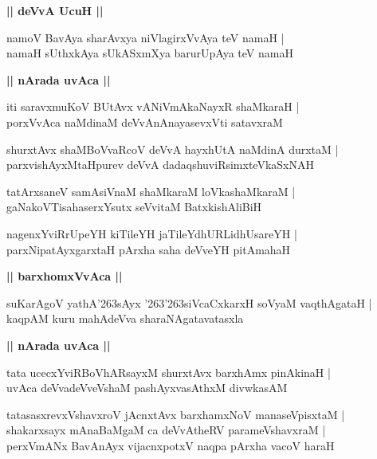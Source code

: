 \documentclass[twoside,12pt,openright]{book}
\def\S{\char'263}
\newcounter{shloka}[chapter]
\def\uvaca#1{\centerline{{\large\textbf{#1}}}}
\begin{document}
\uvaca{|| deVvA UcuH ||}

\begin{shloka}%
namoV BavAya sharAvxya  niVlagirxVvAya teV namaH |\\
namaH sUthxkAya sUkASxmXya barurUpAya teV namaH 
\end{shloka}

\uvaca{|| nArada uvAca ||}

\begin{shloka}%
iti saravxmuKoV BUtAvx vANiVmAkaNayxR shaMkaraH |\\
porxVvAca naMdinaM deVvAnAnayasevxVti satavxraM 
\end{shloka}

\begin{shloka}%
shurxtAvx shaMBoVvaRcoV deVvA hayxhUtA naMdinA durxtaM |\\
parxvishAyxMtaHpurev deVvA dadaqshuviRsimxteVkaSxNAH
\end{shloka}

\begin{shloka}%
tatArxsaneV samAsiVnaM shaMkaraM loVkashaMkaraM |\\
gaNakoVTisahaserxYsutx seVvitaM BatxkishAliBiH 
\end{shloka}

\begin{shloka}%
nagenxYviRrUpeYH kiTileYH jaTileYdhURLidhUsareYH |\\
parxNipatAyxgarxtaH pArxha saha deVveYH pitAmahaH
\end{shloka}

\uvaca{|| barxhomxVvAca ||}

\begin{shloka}%
suKarAgoV yathA\S sAyx \S\S siVcaCxkarxH soVyaM vaqthAgataH |\\
kaqpAM kuru mahAdeVva sharaNAgatavatasxla
\end{shloka}

\uvaca{|| nArada uvAca ||}

\begin{shloka}%
tata ucecxYviRBoVhARsayxM shurxtAvx barxhAmx pinAkinaH |\\
uvAca deVvadeVveVshaM pashAyxvasAthxM divwkasAM 
\end{shloka}

\begin{shloka}%
tatasasxrevxVshavxroV jAcnxtAvx barxhamxNoV manaseVpisxtaM |\\
shakarxsayx mAnaBaMgaM ca deVvAtheRV parameVshavxraM |\\
perxVmANx BavAnAyx vijacnxpotxV naqpa pArxha vacoV haraH 
\end{shloka}
\end{document}
